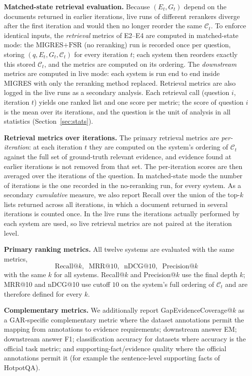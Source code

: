 \documentclass[11pt,a4paper]{article}
\begin{document}
\textbf{Matched-state retrieval evaluation.} Because $(E_t,G_t)$ depend on the documents returned in earlier iterations, live runs of different rerankers diverge after the first iteration and would then no longer reorder the same $\mathcal{C}_t$. To enforce identical inputs, the \emph{retrieval} metrics of E2--E4 are computed in matched-state mode: the MIGRES$+\mathrm{FSR}$ (no reranking) run is recorded once per question, storing $(q,E_t,G_t,\mathcal{C}_t)$ for every iteration $t$; each system then reorders exactly this stored $\mathcal{C}_t$, and the metrics are computed on its ordering. The \emph{downstream} metrics are computed in live mode: each system is run end to end inside MIGRES with only the reranking method replaced. Retrieval metrics are also logged in the live runs as a secondary analysis. Each retrieval call (question $i$, iteration $t$) yields one ranked list and one score per metric; the score of question $i$ is the mean over its iterations, and the question is the unit of analysis in all statistics (Section~\ref{sec:stats}).

\textbf{Retrieval metrics over iterations.} The primary retrieval metrics are \emph{per-iteration}: at each iteration $t$ they are computed on the system's ordering of $\mathcal{C}_t$ against the full set of ground-truth relevant evidence, and evidence found at earlier iterations is not removed from that set. The per-iteration scores are then averaged over the iterations of the question. In matched-state mode the number of iterations is the one recorded in the no-reranking run, for every system. As a secondary \emph{cumulative} measure, we also report Recall over the union of the top-$k$ lists returned across all iterations, in which a document returned in several iterations is counted once. In the live runs the iterations actually performed by each system are used, so live retrieval metrics are not paired at the iteration level.

\textbf{Primary ranking metrics.} All twelve systems are evaluated with the same metrics,
\[
\boxed{\text{Recall@}k,\;\; \text{MRR@10},\;\; \text{nDCG@10},\;\; \text{Precision@}k}
\]
with the same $k$ for all systems. Recall@$k$ and Precision@$k$ use the final depth $k$; MRR@10 and nDCG@10 use cutoff $10$ on the system's full ordering of $\mathcal{C}_t$ and are therefore defined for every $k$.

\textbf{Complementary metrics.} We additionally report GapEvidenceCoverage@$k$ as a GAR-specific complementary metric where the dataset annotations permit the mapping from annotations to evidence requirements; downstream answer EM; downstream answer F1; classification accuracy for datasets where accuracy is the official task metric; and supporting-fact/evidence quality where the official annotations permit it (for example the sentence-level supporting facts of HotpotQA).
\end{document}
